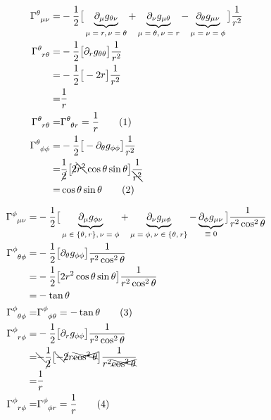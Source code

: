 \documentclass[]{article}
\newcommand\numberthis{\addtocounter{equation}{1}\tag{\theequation}}
\begin{document}
\begin{align*}
	\Gamma\indices{^\theta_{\mu\nu}} =&- \frac{1}{2} \big[\underbrace{ \partial_\mu g_{\theta\nu}}_\text{$\mu=r,\nu=\theta$} + \underbrace{\partial_\nu g_{\mu \theta}}_\text{$\mu=\theta,\nu=r$} - \underbrace{\partial_\theta g_{\mu\nu}}_\text{$\mu=\nu=\phi$}\big] \frac{1}{r^2} \\
	\Gamma\indices{^\theta_{r\theta}} =& - \frac{1}{2} \big[\partial_r g_{\theta\theta} \big] \frac{1}{r^2}\\
	=& - \frac{1}{2} \big[-2r \big] \frac{1}{r^2}\\
	=& \frac{1}{r} \\
	\Gamma\indices{^\theta_{r\theta}} =& \Gamma\indices{^\theta_{\theta r}} =\frac{1}{r} \numberthis \label{eq:Gamma:tHtHr}\\
	\Gamma\indices{^\theta_{\phi\phi}} =&- \frac{1}{2} \big[-\partial_\theta g_{\phi\phi}\big] \frac{1}{r^2}\\
	=& \frac{1}{\cancel{2}} \big[\cancel{2} \bcancel{r^2} \cos \theta \sin \theta\big] \frac{1}{\bcancel{r^2}}\\
	=& \cos \theta \sin \theta \numberthis \label{eq:Gamma:tHpHpH}		
\end{align*}

\begin{align*}
	\Gamma\indices{^\phi_{\mu\nu}} =&- \frac{1}{2} \big[\underbrace{ \partial_\mu g_{\phi\nu}}_\text{$\mu\in\{\theta,r\},\nu=\phi$} + \underbrace{\partial_\nu g_{\mu \phi}}_\text{$\mu=\phi,\nu\in\{\theta,r\}$} - \underbrace{\partial_\phi g_{\mu\nu}}_\text{$\equiv0$}\big] \frac{1}{r^2 \cos^2 \theta} \\
	\Gamma\indices{^\phi_{\theta\phi}} =&- \frac{1}{2} \big[ \partial_\theta g_{\phi\phi} \big] \frac{1}{r^2 \cos^2 \theta}\\
	=&- \frac{1}{2} \big[ 2 r^2 \cos \theta \sin \theta \big] \frac{1}{r^2 \cos^2 \theta}\\
	=&-\tan \theta \\
	\Gamma\indices{^\phi_{\theta\phi}} =&\Gamma\indices{^\phi_{\phi\theta}} = -\tan \theta \numberthis \label{eq:Gamma:pHpHtH}\\
	\Gamma\indices{^\phi_{r\phi}} =& - \frac{1}{2} \big[\partial_r g_{\phi\phi}\big] \frac{1}{r^2 \cos^2 \theta}	\\
	=& \bcancel{-} \frac{1}{\cancel{2}} \big[\bcancel{-} \cancel{2} r \xcancel{\cos^2 \theta} \big] \frac{1}{r^2 \xcancel{\cos^2 \theta}}	\\
	=& \frac{1}{r}\\
	\Gamma\indices{^\phi_{r\phi}} =& \Gamma\indices{^\phi_{\phi r}} = \frac{1}{r} \numberthis \label{eq:Gamma:pHrpH}
\end{align*}
\end{document}
